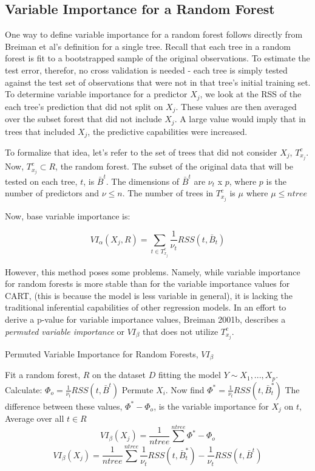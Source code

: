 \documentclass[12pt,twoside]{reedthesis}
\begin{document}
  \subsection{Variable Importance for a Random
  Forest}\label{variable-importance-for-a-random-forest}
  
  One way to define variable importance for a random forest follows
  directly from Breiman et al's definition for a single tree. Recall that
  each tree in a random forest is fit to a bootstrapped sample of the
  original observations. To estimate the test error, therefor, no cross
  validation is needed - each tree is simply tested against the test set
  of observations that were not in that tree's initial training set. To
  determine variable importance for a predictor \(X_j\), we look at the
  RSS of the each tree's prediction that did not split on \(X_j\). These
  values are then averaged over the subset forest that did not include
  \(X_j\). A large value would imply that in trees that included \(X_j\),
  the predictive capabilities were increased.
  
  To formalize that idea, let's refer to the set of trees that did not
  consider \(X_j\), \(T_{x_j}^c\). Now, \(T_{x_j}^c \subset R\), the
  random forest. The subset of the original data that will be tested on
  each tree, \(t\), is \(\bar{B}^t\). The dimensions of \(\bar{B}^t\) are
  \(\nu_t\) x \(p\), where \(p\) is the number of predictors and
  \(\nu \leq n\). The number of trees in \(T_{x_j}^c\) is \(\mu\) where
  \(\mu \leq ntree\)
  
  Now, base variable importance is:
  
  \[VI_{\alpha}(X_j, R) =  \sum_{t \in T_{x_j}^c} \frac 1 {\nu_t} RSS(t,\bar{B}_t)\]
  
  However, this method poses some problems. Namely, while variable
  importance for random forests is more stable than for the variable
  importance values for CART, (this is because the model is less variable
  in general), it is lacking the traditional inferential capabilities of
  other regression models. In an effort to derive a p-value for variable
  importance values, Breiman 2001b, describes a \emph{permuted variable
  importance} or \(VI_{\beta}\) that does not utilize \(T_{x_j}^c\).
  
  \begin{algorithm}
  \caption{Permuted Variable Importance for Random Forests, $VI_{\beta}$}
  \label{breiman}
  \begin{algorithmic}[1]
  \State Fit a random forest, $R$ on the dataset $D$ fitting the model $Y \sim X_1,...,X_p$.
  \State Calculate: $\Phi_o =  \frac 1 {\nu_t} RSS(t,\bar{B}^t)$
  \State Permute $X_i$. Now find $\Phi^* =  \frac 1 {\nu_t} RSS(t,\bar{B}_t^*)$
  \State The difference between these values, $\Phi^* - \Phi_o$,  is the variable importance for $X_j$ on $t$,  
  \EndFor
  \State Average over all $t \in R$ 
   $$VI_{\beta}(X_j) = \frac 1 {ntree} \sum^{ntree} \Phi^* - \Phi_o$$
   $$VI_{\beta}(X_j) = \frac 1 {ntree} \sum^{ntree} \frac 1 {\nu_t} RSS(t,\bar{B}_t^*) - \frac 1 {\nu_t} RSS(t,\bar{B}^t)$$
  \EndFor
  \end{algorithmic}
  \end{algorithm}
  
\end{document}
